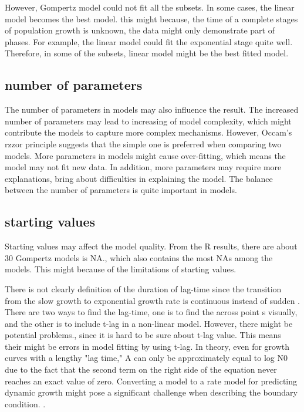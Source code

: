 \documentclass{article}
\begin{document}
However, Gompertz model could not fit all the subsets. In some cases, the linear model becomes the best model. this might because, the time of a complete stages of population growth is unknown, the data might only demonstrate part of phases. For example, the linear model could fit the exponential stage quite well. Therefore, in some of the subsets, linear model might be the best fitted model. 

\subsection{number of parameters}
The number of parameters in models may also influence the result. The increased number of parameters may lead to increasing of model complexity, which might contribute the models to capture more complex mechanisms. However, Occam’s rzzor principle suggests that the simple one is preferred when comparing two models\cite{domingos1999}. More parameters in models might cause over-fitting, which means the model may not fit new data\cite{domingos1999}. In addition, more parameters may require more explanations, bring about difficulties in explaining the model. The balance between the number of parameters is quite important in models. 

\subsection{starting values}
Starting values may affect the model quality. From the R results, there are about 30 Gompertz models is NA., which also contains the most NAs among the models. This might because of the limitations of starting values.

There is not clearly definition of the duration of lag-time since the transition from the slow growth to exponential growth rate is continuous instead of sudden \cite{peleg2011}. There are two ways to find the lag-time, one is to find the across point s visually, and the other is to include t-lag in a non-linear model\cite{mckellar2003}. However, there might be potential problems., since it is hard to be sure about t-lag value. This means their might be errors in model fitting by using t-lag. In theory, even for growth curves with a lengthy "lag time," A can only be approximately equal to log N0 due to the fact that the second term on the right side of the equation never reaches an exact value of zero. Converting a model to a rate model for predicting dynamic growth might pose a significant challenge when describing the boundary condition. .
\end{document}
